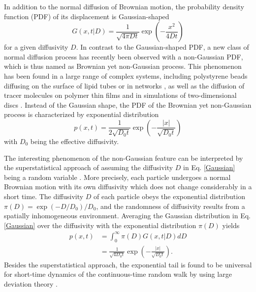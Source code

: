 \documentclass[aps,pre,twocolumn,groupedaddress,longbibliography]{revtex4-2}
\begin{document}
In addition to the normal diffusion of Brownian motion, the probability density function (PDF) of its displacement is Gaussian-shaped \cite{VanKampen:1992,CoffeyKalmykovWaldron:2004}
\begin{equation}\label{Gaussian}
  G(x,t|D)=\frac{1}{\sqrt{4\pi Dt}}\exp\left(-\frac{x^2}{4Dt}\right)
\end{equation}
for a given diffusivity $D$. In contrast to the Gaussian-shaped PDF, a new class of normal diffusion process has recently been observed with a non-Gaussian PDF, which is thus named as Brownian yet non-Gaussian process. This phenomenon has been found in a large range of complex systems, including polystyrene beads diffusing on the surface of lipid tubes \cite{WangAnthonyBaeGranick:2009} or in networks \cite{WangAnthonyBaeGranick:2009,ToyotaHeadSchmidtMizuno:2011,SilvaStuhrmannBetzKoenderink:2014}, as well as the diffusion of tracer molecules on polymer thin films \cite{Bhattacharya-etal:2013} and in simulations of two-dimensional discs \cite{KimKimSung:2013}. Instead of the Gaussian shape, the PDF of the Brownian yet non-Gaussian process is characterized by exponential distribution
\begin{equation}\label{Exponential}
  p(x,t)= \frac{1}{2\sqrt{D_0t}}\exp\left(-\frac{|x|}{\sqrt{D_0t}}\right)
\end{equation}
with $D_0$ being the effective diffusivity.

The interesting phenomenon of the non-Gaussian feature can be interpreted by the superstatistical approach of assuming the diffusivity $D$ in Eq. \eqref{Gaussian} being a random variable \cite{Beck:2001,BeckCohen:2003,Beck:2006}.
More precisely, each particle undergoes a normal Brownian motion with its own diffusivity which does not change considerably in a short time. The diffusivity $D$ of each particle obeys the exponential distribution
$\pi(D)=\exp(-D/D_0)/D_0$, and the randomness of diffusivity results from a spatially inhomogeneous environment. Averaging the Gaussian distribution in Eq. \eqref{Gaussian} over the diffusivity with the exponential distribution $\pi(D)$ yields \cite{WangKuoBaeGranick:2012,HapcaCrawfordYoung:2009}
\begin{equation}\label{PDF-x}
\begin{split}
    p(x,t)&=\int_0^\infty \pi(D)G(x,t|D)dD  \\
    &=\frac{1}{\sqrt{4D_0t}}\exp\left(-\frac{|x|}{\sqrt{D_0t}}\right).
\end{split}
\end{equation}
Besides the superstatistical approach, the exponential tail is found to be universal for short-time dynamics of the continuous-time random walk by using large deviation theory  \cite{BarkaiBurov:2020,WangBarkaiBurov:2020}.
\end{document}
